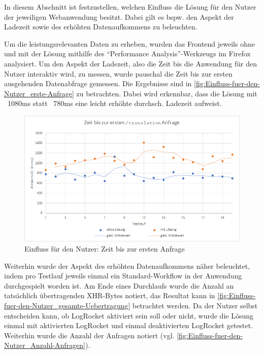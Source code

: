 
In diesem Abschnitt ist festzustellen, welchen Einfluss die Lösung für den Nutzer der jeweiligen Webanwendung besitzt. Dabei gilt es bspw. den Aspekt der Ladezeit sowie des erhöhten Datenaufkommens zu beleuchten.

Um die leistungsrelevanten Daten zu erheben, wurden das Frontend jeweils ohne und mit der Lösung mithilfe des \enquote{Performance Analysis}-Werkzeugs im Firefox \cite{FirefoxPerformanceAnalysis} analysiert. Um den Aspekt der Ladezeit, also die Zeit bis die Anwendung für den Nutzer interaktiv wird, zu messen, wurde pauschal die Zeit bis zur ersten ausgehenden Datenabfrage gemessen. Die Ergebnisse sind in \autoref{fig:Einfluss-fuer-den-Nutzer_erste-Anfrage} zu betrachten. Dabei wird erkennbar, dass die Lösung mit ~1080ms statt ~780ms eine leicht erhöhte durchsch. Ladezeit aufweist.

\begin{figure}[H]
	\centering
	\includegraphics[width=1.00\linewidth]{data/Einfluss-fuer-den-Nutzer/Einfluss-fuer-den-Nutzer_erste-Anfrage.png}
	\caption{Einfluss für den Nutzer: Zeit bis zur ersten Anfrage}
	\label{fig:Einfluss-fuer-den-Nutzer_erste-Anfrage}
\end{figure}

Weiterhin wurde der Aspekt des erhöhten Datenaufkommens näher beleuchtet, indem pro Testlauf jeweils einmal ein Standard-Workflow in der Anwendung durchgespielt worden ist. Am Ende eines Durchlaufs wurde die Anzahl an tatsächlich\footnotemark{} übertragenden XHR-Bytes notiert, das Resultat kann in  \autoref{fig:Einfluss-fuer-den-Nutzer_gesamte-Uebertragung} betrachtet werden. Da der Nutzer selbst entscheiden kann, ob LogRocket aktiviert sein soll oder nicht, wurde die Lösung einmal mit aktivierten LogRocket und einmal deaktivierten LogRocket getestet. Weiterhin wurde die Anzahl der Anfragen notiert (vgl. \autoref{fig:Einfluss-fuer-den-Nutzer_Anzahl-Anfragen}).

